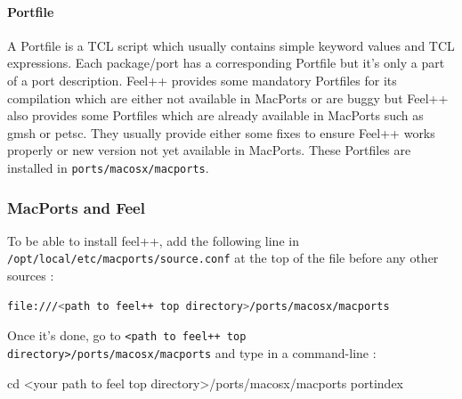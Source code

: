\documentclass[a4paper]{book}
\begin{document}
\paragraph{Portfile}
A Portfile is a TCL script which usually contains simple keyword values and TCL expressions. Each package/port has a corresponding Portfile but it's only a part of a port description.
Feel++ provides some mandatory Portfiles for its compilation which are either not available in MacPorts or are buggy but Feel++ also provides some Portfiles which are already available in MacPorts such as gmsh or petsc. They usually provide either some fixes to ensure Feel++ works properly or new version not yet available in MacPorts. \newline \newline
These Portfiles are installed in \verb|ports/macosx/macports|.

\subsubsection{MacPorts and Feel}


To be able to install feel++, add the following line in \verb|/opt/local/etc/macports/source.conf|
at the top of the file before any other sources :
\begin{lstlisting}[language=sh]
file:///<path to feel++ top directory>/ports/macosx/macports
\end{lstlisting} 

Once it's done, go to \verb|<path to feel++ top directory>/ports/macosx/macports| and type in a command-line :
\begin{unixcom}
		cd <your path to feel top directory>/ports/macosx/macports 
		portindex
\end{unixcom}
\end{document}

